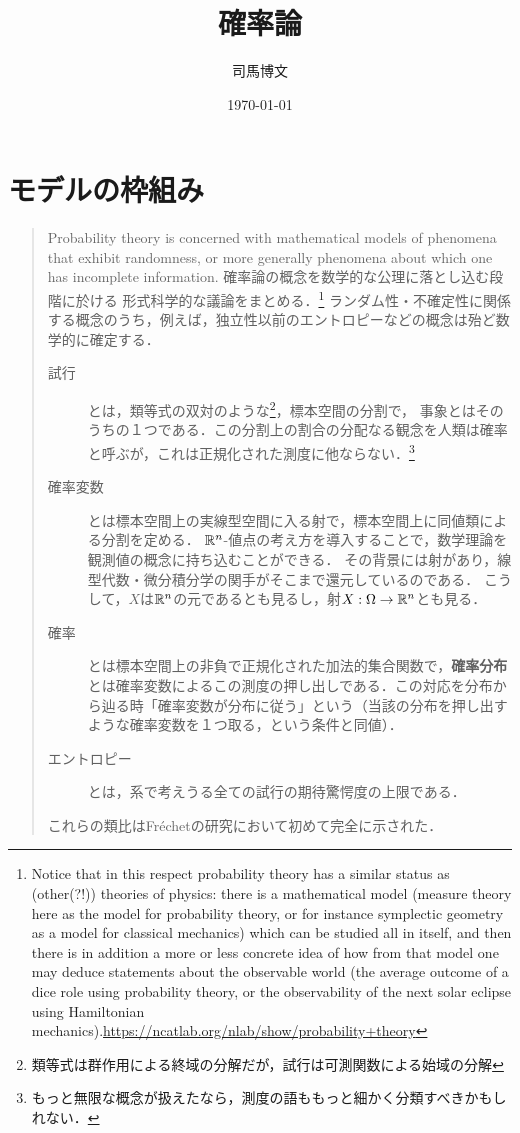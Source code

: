 \documentclass[uplatex,dvipdfmx]{jsreport}
\title{確率論}
\author{司馬博文}
\date{\today}
\begin{document}
\tableofcontents

\chapter{モデルの枠組み}

\begin{quotation}
    Probability theory is concerned with mathematical models of phenomena that exhibit randomness, or more generally phenomena about which one has incomplete information.
    確率論の概念を数学的な公理に落とし込む段階に於ける
    形式科学的な議論をまとめる．\footnote{Notice that in this respect probability theory has a similar status as (other(?!)) theories of physics: there is a mathematical model (measure theory here as the model for probability theory, or for instance symplectic geometry as a model for classical mechanics) which can be studied all in itself, and then there is in addition a more or less concrete idea of how from that model one may deduce statements about the observable world (the average outcome of a dice role using probability theory, or the observability of the next solar eclipse using Hamiltonian mechanics).\url{https://ncatlab.org/nlab/show/probability+theory}}
    ランダム性・不確定性に関係する概念のうち，例えば，独立性以前のエントロピーなどの概念は殆ど数学的に確定する．
    \begin{description}
        \item[試行] とは，類等式の双対のような\footnote{類等式は群作用による終域の分解だが，試行は可測関数による始域の分解}，標本空間の分割で，
        事象とはそのうちの１つである．この分割上の割合の分配なる観念を人類は確率と呼ぶが，これは正規化された測度に他ならない．\footnote{もっと無限な概念が扱えたなら，測度の語ももっと細かく分類すべきかもしれない．}
        \item[確率変数] とは標本空間上の実線型空間に入る射で，標本空間上に同値類による分割を定める．
        $\mathbb{R}^n$-値点の考え方を導入することで，数学理論を観測値の概念に持ち込むことができる．
        その背景には射があり，線型代数・微分積分学の関手がそこまで還元しているのである．
        こうして，$X$は$\mathbb{R}^n$の元であるとも見るし，射$X:\Omega\to\mathbb{R}^n$とも見る．
        \item[確率] とは標本空間上の非負で正規化された加法的集合関数で，\textbf{確率分布}とは確率変数によるこの測度の押し出しである．この対応を分布から辿る時「確率変数が分布に従う」という（当該の分布を押し出すような確率変数を１つ取る，という条件と同値）．
        \item[エントロピー] とは，系で考えうる全ての試行の期待驚愕度の上限である．
    \end{description}
    これらの類比はFréchetの研究において初めて完全に示された．


\end{quotation}
\end{document}
